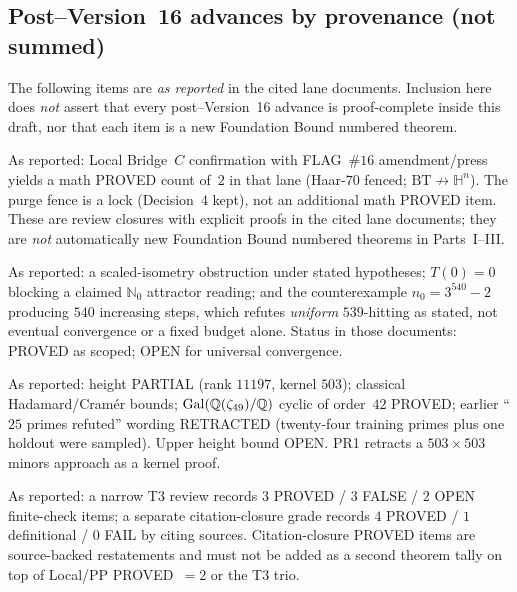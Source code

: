 \subsection{Post--Version~16 advances by provenance (not summed)}
\noindent The following items are \emph{as reported} in the cited lane documents. Inclusion here does \emph{not} assert that every post--Version~16 advance is proof-complete inside this draft, nor that each item is a new Foundation Bound numbered theorem.

\begin{remark}\label{rem:v17-local-pp}
As reported: Local Bridge~$C$ confirmation with FLAG~$\#16$ amendment/press yields a math PROVED count of~$2$ in that lane (Haar-$70$ fenced; $\mathrm{BT}\not\to\mathbb H^n$). The purge fence is a lock (Decision~$4$ kept), not an additional math PROVED item. These are review closures with explicit proofs in the cited lane documents; they are \emph{not} automatically new Foundation Bound numbered theorems in Parts~I--III.
\end{remark}

\begin{remark}\label{rem:v17-nl}
As reported: a scaled-isometry obstruction under stated hypotheses; $T(0)=0$ blocking a claimed $\mathbb N_0$ attractor reading; and the counterexample $n_0=3^{540}-2$ producing $540$ increasing steps, which refutes \emph{uniform} $539$-hitting as stated, not eventual convergence or a fixed budget alone. Status in those documents: PROVED as scoped; OPEN for universal convergence.
\end{remark}

\begin{remark}\label{rem:v17-eigen}
As reported: height PARTIAL (rank $11197$, kernel $503$); classical Hadamard/Cram\'er bounds; $\mathrm{Gal}(\mathbb{Q}(\zeta_{49})/\mathbb{Q})$ cyclic of order~$42$ PROVED; earlier ``$25$ primes refuted'' wording RETRACTED (twenty-four training primes plus one holdout were sampled). Upper height bound OPEN. PR1 retracts a $503\times503$ minors approach as a kernel proof.
\end{remark}

\begin{remark}\label{rem:v17-pr2}
As reported: a narrow T3 review records $3$ PROVED / $3$ FALSE / $2$ OPEN finite-check items; a separate citation-closure grade records $4$ PROVED / $1$ definitional / $0$ FAIL by citing sources. Citation-closure PROVED items are source-backed restatements and must not be added as a second theorem tally on top of Local/PP PROVED~$=2$ or the T3 trio.
\end{remark}

